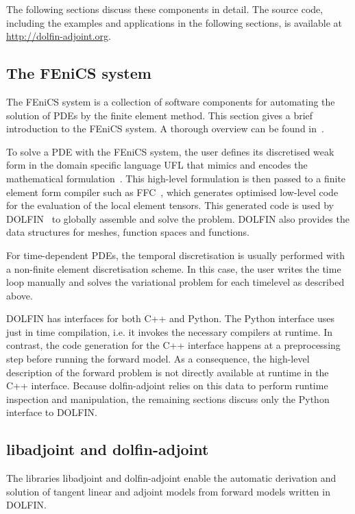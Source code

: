 \documentclass[prodmode,acmtoms]{acmsmall}
\newcommand{\fenics}{{\mbox{FEniCS}}\xspace}
\newcommand{\dolfin}{{\mbox{DOLFIN}}\xspace}
\newcommand{\da}{\mbox{{dolfin-adjoint}}\xspace}
\newcommand{\libadjoint}{\mbox{{libadjoint}}\xspace}
\begin{document}
The following sections discuss these components in detail.
The source code, including the examples and applications in the following sections, is available at \url{http://dolfin-adjoint.org}.

\subsection{The \fenics system} \label{sec:fenics}
The \fenics system is a collection of software components for automating
the solution of PDEs by the finite element method.
This section gives a brief introduction to the \fenics system.
A thorough overview can be found in~.

To solve a PDE with the \fenics system, the user defines its discretised weak form in the domain specific language UFL that mimics and encodes the mathematical formulation~\cite{alnaes2011,alnaes2012}.
This high-level formulation is then passed to a finite element form compiler such as FFC~\cite{kirby2006}, which generates optimised low-level code for the 
evaluation of the local element tensors.
This generated code is used by \dolfin~\cite{logg2010a,logg2011a} to globally assemble and solve the problem.
\dolfin also provides the data structures for meshes, function spaces and functions.

For time-dependent PDEs, the temporal discretisation is usually performed with a non-finite element discretisation scheme. 
In this case, the user writes the time loop manually and solves the variational problem for each timelevel as described above. 

\dolfin has interfaces for both C++ and Python.
The Python interface uses just in time compilation, i.e. it invokes the necessary compilers at runtime. 
In contrast, the code generation for the C++ interface happens at a preprocessing step before running the forward model. 
As a consequence, the high-level description of the forward problem is not directly available at runtime in the C++ interface. 
Because \da relies on this data to perform runtime inspection and manipulation, the remaining sections discuss only the Python interface to \dolfin. 

\subsection{\libadjoint and \da}
The libraries \libadjoint and \da enable the automatic derivation and solution of tangent linear and adjoint models from forward models written in \dolfin.
\end{document}
